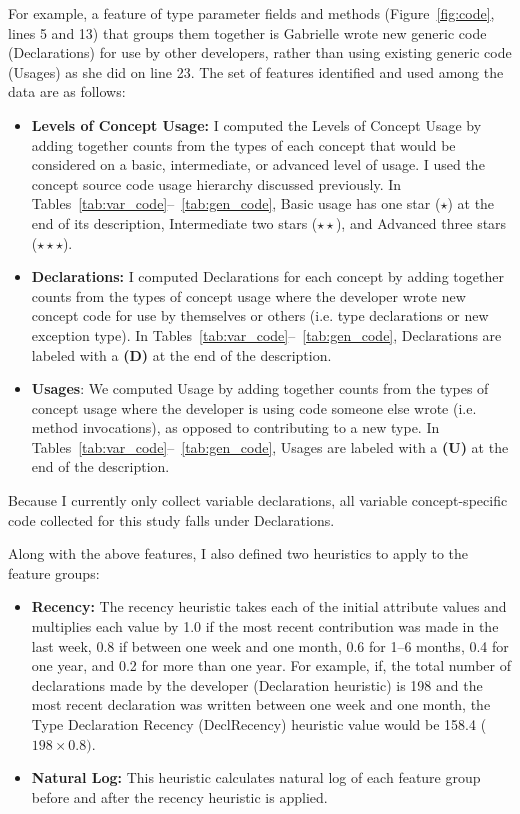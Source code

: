For example, a feature of type parameter fields and methods (Figure~\ref{fig:code}, lines 5 and 13) that groups them together is Gabrielle wrote new generic code (Declarations) for use by other developers, rather than using existing generic code (Usages) as she did on line 23.
The set of features identified and used among the data are as follows:
\begin{itemize}
	\item \textbf{Levels of Concept Usage:} I computed the Levels of Concept Usage by adding together counts from the types of each concept that would be considered on a basic, intermediate, or advanced level of usage. I used the concept source code usage hierarchy discussed previously. 
	In Tables~\ref{tab:var_code}--~\ref{tab:gen_code}, Basic usage has one star (\textbf{$\star$}) at the end of its description, Intermediate two stars (\textbf{$\star\star$}), and Advanced three stars (\textbf{$\star\star\star$}).
	\item \textbf{Declarations:} I computed Declarations for each concept by adding together counts from the types of concept usage where the developer wrote new concept code for use by themselves or others (i.e. type declarations or new exception type). In Tables~\ref{tab:var_code}--~\ref{tab:gen_code}, Declarations are labeled with a \textbf{(D)} at the end of the description.
	\item \textbf{Usages}: We computed Usage by adding together counts from the types of concept usage where the developer is using code someone else wrote (i.e. method invocations), as opposed to contributing to a new type. In Tables~\ref{tab:var_code}--~\ref{tab:gen_code}, Usages are labeled with a \textbf{(U)} at the end of the description.
\end{itemize}

Because I currently only collect variable declarations, all variable concept-specific code collected for this study falls under Declarations.

Along with the above features, I also defined two heuristics to apply to the feature groups:

\begin{itemize}
	\item \textbf{Recency:} The recency heuristic takes each of the initial attribute values and multiplies each value by 1.0 if the most recent contribution was made in the last week, 0.8 if between one week and one month, 0.6 for 1--6 months, 0.4 for one year, and 0.2 for more than one year.
	For example, if, the total number of declarations made by the developer (Declaration heuristic) is 198 and the most recent declaration was written between one week and one month, the Type Declaration Recency (DeclRecency) heuristic value would be 158.4 (\(198 \times 0.8)\). 
	\item \textbf{Natural Log:} This heuristic calculates natural log of each feature group before and after the recency heuristic is applied.
\end{itemize}

